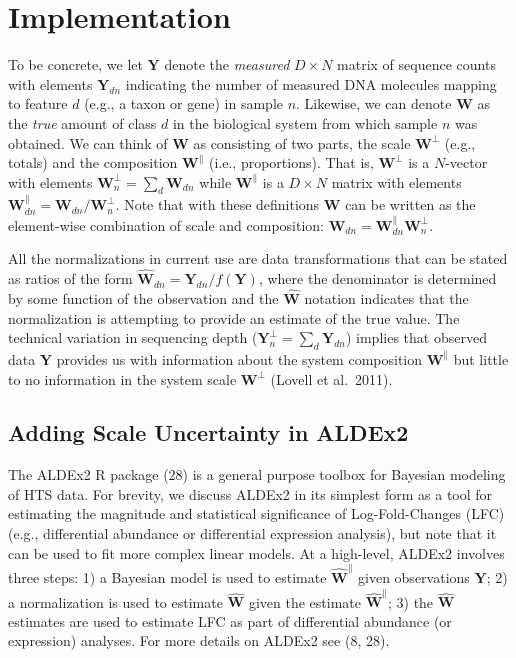 \documentclass[
]{article}
\begin{document}
\section{Implementation}\label{implementation}

To be concrete, we let \(\mathbf{Y}\) denote the \emph{measured}
\(D \times N\) matrix of sequence counts with elements
\(\mathbf{Y}_{dn}\) indicating the number of measured DNA molecules
mapping to feature \(d\) (e.g., a taxon or gene) in sample \(n\).
Likewise, we can denote \(\mathbf{W}\) as the \emph{true} amount of
class \(d\) in the biological system from which sample \(n\) was
obtained. We can think of \(\mathbf{W}\) as consisting of two parts, the
scale \(\mathbf{W}^{\perp}\) (e.g., totals) and the composition
\(\mathbf{W}^{\parallel}\) (i.e., proportions). That is,
\(\mathbf{W}^{\perp}\) is a \(N\)-vector with elements
\(\mathbf{W}^{\perp}_{n}=\sum_{d}\mathbf{W}_{dn}\) while
\(\mathbf{W}^{\parallel}\) is a \(D \times N\) matrix with elements
\(\mathbf{W}^{\parallel}_{dn}=\mathbf{W}_{dn}/\mathbf{W}^{\perp}_{n}\).
Note that with these definitions \(\mathbf{W}\) can be written as the
element-wise combination of scale and composition:
\(\mathbf{W}_{dn}=\mathbf{W}^{\parallel}_{dn}\mathbf{W}^{\perp}_{n}\).

All the normalizations in current use are data transformations that can
be stated as ratios of the form
\(\hat{{\mathbf{W}}}_{dn}=\mathbf{Y}_{dn}/f(\mathbf{Y})\), where the
denominator is determined by some function of the observation and the
\(\hat{{\mathbf{W}}}\) notation indicates that the normalization is
attempting to provide an estimate of the true value. The technical
variation in sequencing depth
(\(\mathbf{Y}^{\perp}_{n}=\sum_{d}\mathbf{Y}_{dn}\)) implies that
observed data \(\mathbf{Y}\) provides us with information about the
system composition \(\mathbf{W}^{\parallel}\) but little to no
information in the system scale \(\mathbf{W}^{\perp}\) (Lovell et
al.~2011).

\subsection{Adding Scale Uncertainty in
ALDEx2}\label{adding-scale-uncertainty-in-aldex2}

The ALDEx2 R package (28) is a general purpose toolbox for Bayesian
modeling of HTS data. For brevity, we discuss ALDEx2 in its simplest
form as a tool for estimating the magnitude and statistical significance
of Log-Fold-Changes (LFC) (e.g., differential abundance or differential
expression analysis), but note that it can be used to fit more complex
linear models. At a high-level, ALDEx2 involves three steps: 1) a
Bayesian model is used to estimate \(\mathbf{\hat{W}}^{\parallel}\)
given observations \(\mathbf{Y}\); 2) a normalization is used to
estimate \(\mathbf{\hat{W}}\) given the estimate
\(\mathbf{\hat{W}}^{\parallel}\); 3) the \(\mathbf{\hat{W}}\) estimates
are used to estimate LFC as part of differential abundance (or
expression) analyses. For more details on ALDEx2 see (8, 28).
\end{document}
